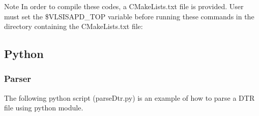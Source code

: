 \begin{DoxyNote}{Note}
In order to compile these codes, a C\+Make\+Lists.\+txt file is provided. User must set the \$\+V\+L\+S\+I\+S\+A\+P\+D\+\_\+\+T\+OP variable before running these commands in the directory containing the C\+Make\+Lists.\+txt file\+: 
\begin{DoxyCode}
\end{DoxyCode}

\end{DoxyNote}
\hypertarget{dtr_dtrPython}{}\subsection{Python}\label{dtr_dtrPython}
\hypertarget{dtr_dtrParsePython}{}\subsubsection{Parser}\label{dtr_dtrParsePython}
The following python script ({\ttfamily parse\+Dtr.\+py}) is an example of how to parse a D\+TR file using python module. 
